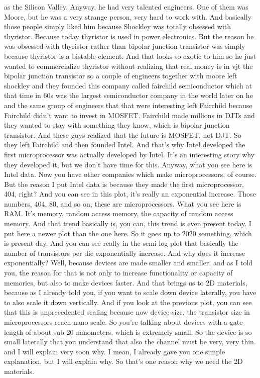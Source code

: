 as the Silicon Valley. Anyway, he had very talented engineers. One of them was Moore, but he was a very strange person, very hard to work with. And basically those people simply liked him because Shockley was totally obsessed with thyristor. Because today thyristor is used in power electronics. But the reason he was obsessed with thyristor rather than bipolar junction transistor was simply because thyristor is a bistable element. And that looks so exotic to him so he just wanted to commercialize thyristor without realizing that real money is in vjt the bipolar junction transistor so a couple of engineers together with moore left shockley and they founded this company called fairchild semiconductor which at that time in 60s was the largest semiconductor company in the world later on he and the same group of engineers that that were interesting left Fairchild because Fairchild didn't want to invest in MOSFET. Fairchild made millions in DJTs and they wanted to stay with something they know, which is bipolar junction transistor. And these guys realized that the future is MOSFET, not DJT. So they left Fairchild and then founded Intel. And that's why Intel developed the first microprocessor was actually developed by Intel. It's an interesting story why they developed it, but we don't have time for this. Anyway, what you see here is Intel data. Now you have other companies which make microprocessors, of course. But the reason I put Intel data is because they made the first microprocessor, 404, right? And you can see in this plot, it's really an exponential increase. Those numbers, 404, 80, and so on, these are microprocessors. What you see here is RAM. It's memory, random access memory, the capacity of random access memory. And that trend basically is, you can, this trend is even present today. I put here a newer plot than the one here. So it goes up to 2020 something, which is present day. And you can see really in the semi log plot that basically the number of transistors per die exponentially increase. And why does it increase exponentially? Well, because devices are made smaller and smaller, and as I told you, the reason for that is not only to increase functionality or capacity of memories, but also to make devices faster. And that brings us to 2D materials, because as I already told you, if you want to scale down device laterally, you have to also scale it down vertically. And if you look at the previous plot, you can see that this is unprecedented scaling because now device size, the transistor size in microprocessors reach nano scale. So you're talking about devices with a gate length of about sub 20 nanometers, which is extremely small. So the device is so small laterally that you understand that also the channel must be very, very thin. and I will explain very soon why. I mean, I already gave you one simple explanation, but I will explain why. So that's one reason why we need the 2D materials.

